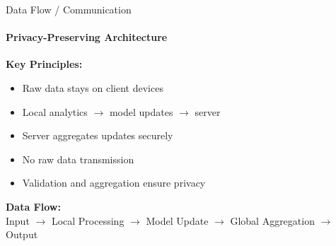 \documentclass[aspectratio=169, 11pt]{beamer}
\begin{document}
\begin{frame}{Data Flow / Communication}
    \framesubtitle{Privacy-Preserving Architecture}

    \textbf{Key Principles:}
    \begin{itemize}
        \item Raw data stays on client devices
        \item Local analytics $\rightarrow$ model updates $\rightarrow$ server
        \item Server aggregates updates securely
        \item No raw data transmission
        \item Validation and aggregation ensure privacy
    \end{itemize}

    \vspace{0.5cm}
    \centering
    \textbf{Data Flow:} \\
    Input $\rightarrow$ Local Processing $\rightarrow$ Model Update $\rightarrow$ Global Aggregation $\rightarrow$ Output
\end{frame}
\end{document}
